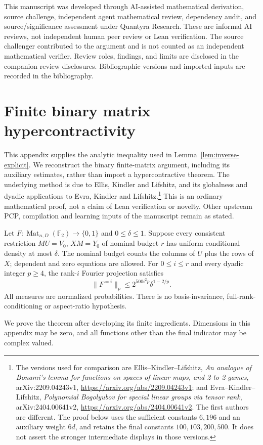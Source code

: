 This manuscript was developed through AI-assisted mathematical derivation, source challenge, independent agent mathematical review, dependency audit, and source/significance assessment under Quantyra Research. These are informal AI reviews, not independent human peer review or Lean verification. The source challenger contributed to the argument and is not counted as an independent mathematical verifier. Review roles, findings, and limits are disclosed in the companion review disclosures. Bibliographic versions and imported inputs are recorded in the bibliography.

\appendix
\section{Finite binary matrix hypercontractivity}\label{app:binary-hc}
This appendix supplies the analytic inequality used in
Lemma~\ref{lem:inverse-explicit}. We reconstruct the binary finite-matrix
argument, including its auxiliary estimates, rather than import a
hypercontractive theorem. The underlying method is due to Ellis, Kindler
and Lifshitz, and its globalness and dyadic applications to Evra, Kindler
and Lifshitz.\footnote{The versions used for comparison are
Ellis--Kindler--Lifshitz, \emph{An analogue of Bonami's lemma for functions
on spaces of linear maps, and 2-to-2 games}, arXiv:2209.04243v1,
\url{https://arxiv.org/abs/2209.04243v1}; and
Evra--Kindler--Lifshitz, \emph{Polynomial Bogolyubov for special linear
groups via tensor rank}, arXiv:2404.00641v2,
\url{https://arxiv.org/abs/2404.00641v2}. The first authors are different.
The proof below uses the sufficient constants $6,196$ and an auxiliary
weight $6d$, and retains the final constants $100,103,200,500$. It does not
assert the stronger intermediate displays in those versions.}
This is an ordinary mathematical proof, not a claim of Lean verification
or novelty. Other upstream PCP, compilation and learning inputs of the
manuscript remain as stated.

\begin{theorem}\label{thm:binary-hc}
Let $F:\operatorname{Mat}_{n,D}(\mathbb F_2)\to\{0,1\}$ and
$0\le\delta\le1$. Suppose every consistent restriction
$MU=V_0$, $XM=Y_0$ of nominal budget $r$ has uniform conditional density
at most $\delta$. The nominal budget counts the columns of $U$ plus the
rows of $X$; dependent and zero equations are allowed. For $0\le i\le r$
and every dyadic integer $p\ge4$, the rank-$i$ Fourier projection satisfies
\[
 \|F^{=i}\|_p\le 2^{500i^2p}\delta^{1-2/p}.
\]
All measures are normalized probabilities. There is no basis-invariance,
full-rank-conditioning or aspect-ratio hypothesis.
\end{theorem}
We prove the theorem after developing its finite ingredients. Dimensions
in this appendix may be zero, and all functions other than the final
indicator may be complex valued.


